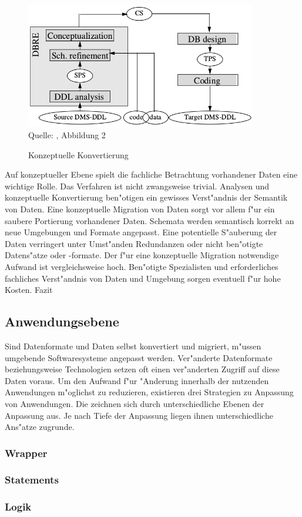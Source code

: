 \begin{figure}[h!]
	\centering
	\caption{Konzeptuelle Konvertierung}
	\label{pic:conversion_conceptual}
	\includegraphics[width=0.9\textwidth]{../images/strategies_fig_02b.png} \\
	\tiny Quelle: \citep{henrard-2002}, Abbildung 2
\end{figure}

Auf konzeptueller Ebene spielt die fachliche Betrachtung vorhandener Daten eine wichtige Rolle. Das Verfahren ist nicht zwangsweise trivial. Analysen und konzeptuelle Konvertierung ben"otigen ein gewisses Verst"andnis der Semantik von Daten.
\lb
Eine konzeptuelle Migration von Daten sorgt vor allem f"ur ein saubere Portierung vorhandener Daten. Schemata werden semantisch korrekt an neue Umgebungen und Formate angepasst. Eine potentielle S"auberung der Daten verringert unter Umst"anden Redundanzen oder nicht ben"otigte Datens"atze oder -formate.
\lb
Der f"ur eine konzeptuelle Migration notwendige Aufwand ist vergleichsweise hoch. Ben"otigte Spezialisten und erforderliches fachliches Verst"andnis von Daten und Umgebung sorgen eventuell f"ur hohe Kosten.
\lb
Fazit %

\subsection{Anwendungsebene}

Sind Datenformate und Daten selbst konvertiert und migriert, m"ussen umgebende Softwaresysteme angepasst werden. Ver"anderte Datenformate beziehungsweise Technologien setzen oft einen ver"anderten Zugriff auf diese Daten voraus. Um den Aufwand f"ur "Anderung innerhalb der nutzenden Anwendungen m"oglichst zu reduzieren, existieren drei Strategien zu Anpassung von Anwendungen. Die zeichnen sich durch unterschiedliche Ebenen der Anpassung aus. Je nach Tiefe der Anpassung liegen ihnen unterschiedliche Ans"atze zugrunde. 

\subsubsection{Wrapper}


\subsubsection{Statements}


\subsubsection{Logik}

